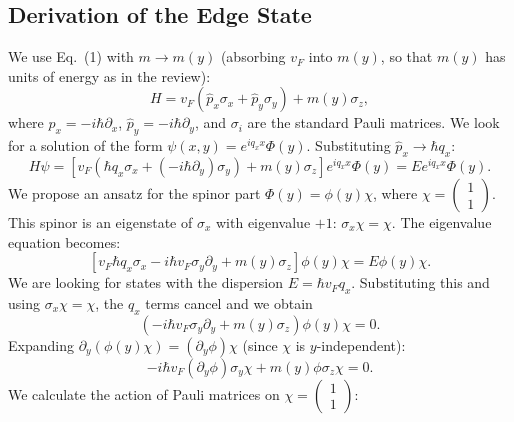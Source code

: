 \documentclass{article}
\begin{document}
	\subsection{Derivation of the Edge State}
	We use Eq.~(1) with $m \to m(y)$ (absorbing $v_F$ into $m(y)$, so that $m(y)$ has units of energy as in the review):
	\begin{equation}
		H = v_F (\hat{p}_x \sigma_x + \hat{p}_y \sigma_y) + m(y) \sigma_z,
	\end{equation}
	where $\hat{p}_x = -i\hbar\partial_x$, $\hat{p}_y = -i\hbar\partial_y$, and $\sigma_i$ are the standard Pauli matrices.
	We look for a solution of the form $\psi(x,y) = e^{i q_x x} \Phi(y)$. Substituting $\hat{p}_x \to \hbar q_x$:
	\begin{equation}
		H \psi = \left[ v_F (\hbar q_x \sigma_x + (-i\hbar\partial_y) \sigma_y) + m(y) \sigma_z \right] e^{i q_x x} \Phi(y) = E e^{i q_x x} \Phi(y).
	\end{equation}
	We propose an ansatz for the spinor part $\Phi(y) = \phi(y) \chi$, where $\chi = \begin{pmatrix} 1 \\ 1 \end{pmatrix}$. This spinor is an eigenstate of $\sigma_x$ with eigenvalue $+1$: $\sigma_x \chi = \chi$.
	The eigenvalue equation becomes:
	\begin{equation}
		\left[ v_F \hbar q_x \sigma_x - i \hbar v_F \sigma_y \partial_y + m(y) \sigma_z \right] \phi(y) \chi = E \phi(y) \chi.
	\end{equation}
	We are looking for states with the dispersion $E = \hbar v_F q_x$. Substituting this and using $\sigma_x \chi = \chi$, the $q_x$ terms cancel and we obtain
	\begin{equation}
		\left( -i \hbar v_F \sigma_y \partial_y + m(y) \sigma_z \right) \phi(y) \chi = 0.
	\end{equation}
	Expanding $\partial_y (\phi(y)\chi) = (\partial_y \phi) \chi$ (since $\chi$ is $y$-independent):
	\begin{equation}
		-i \hbar v_F (\partial_y \phi) \sigma_y \chi + m(y) \phi \sigma_z \chi = 0.
	\end{equation}
	We calculate the action of Pauli matrices on $\chi = \begin{pmatrix} 1 \\ 1 \end{pmatrix}$:
\end{document}
